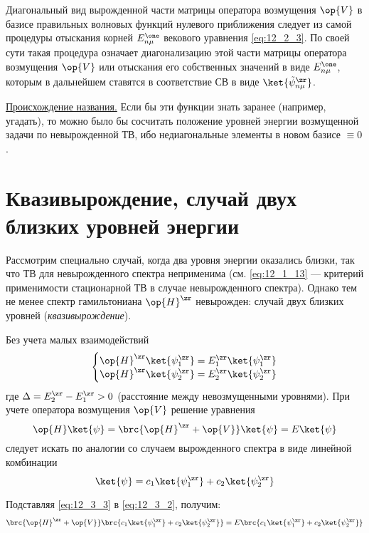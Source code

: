 Диагональный вид вырожденной части матрицы оператора возмущения $\op{V}$ в базисе правильных волновых функций нулевого приближения следует из самой процедуры отыскания корней $E_{n \mu} ^\one$ векового уравнения \eqref{eq:12_2_3}. По своей сути такая процедура означает диагонализацию этой части матрицы оператора возмущения $\op{V}$ или отыскания его собственных значений в виде $E_{n \mu} ^\one$, которым в дальнейшем ставятся в соответствие СВ в виде $\ket{\tilde{\psi}_{n \mu}^\zr}$.

\underline{Происхождение названия.} Если бы эти функции знать заранее (например, угадать), то можно было бы сосчитать положение уровней энергии возмущенной задачи по невырожденной ТВ, ибо недиагональные элементы в новом базисе $\equiv 0$.
 
\section{Квазивырождение, случай двух близких уровней энергии}

Рассмотрим специально случай, когда два уровня энергии оказались близки, так что ТВ для невырожденного спектра неприменима (см. \eqref{eq:12_1_13} --- критерий применимости стационарной ТВ в случае невырожденного спектра). Однако тем не менее спектр гамильтониана $\op{H}^\zr$ невырожден: случай двух близких уровней ({\em квазивырождение}).

Без учета малых взаимодействий
\begin{equation}
\label{eq:12_3_1}
\left \{ 
\begin{matrix}
\op{H}^\zr \ket{\psi_1^\zr} = E_1^\zr \ket{\psi_1^\zr} \\
\op{H}^\zr \ket{\psi_2^\zr} = E_2^\zr \ket{\psi_2^\zr}
\end{matrix}
\right .
\end{equation}
где $\Delta = E_2^\zr - E_1 ^\zr > 0$ (расстояние между невозмущенными уровнями). При учете оператора возмущения $\op{V}$ решение уравнения
\begin{equation}
\label{eq:12_3_2}
\op{H} \ket{\psi} = \brc{\op{H}^\zr + \op{V}} \ket{\psi} = E \ket{\psi}
\end{equation}
следует искать по аналогии со случаем вырожденного спектра в виде линейной комбинации
\begin{equation}
\label{eq:12_3_3}
\ket{\psi} = c_1 \ket{\psi_1^\zr} + c_2 \ket{\psi_2^\zr} 
\end{equation}

Подставляя \eqref{eq:12_3_3} в \eqref{eq:12_3_2}, получим:
$$
\brc{\op{H}^\zr + \op{V}}\brc{c_1 \ket{\psi_1^\zr} + c_2 \ket{\psi_2^\zr}} = E \brc{c_1 \ket{\psi_1^\zr} + c_2 \ket{\psi_2^\zr}} \\
$$

